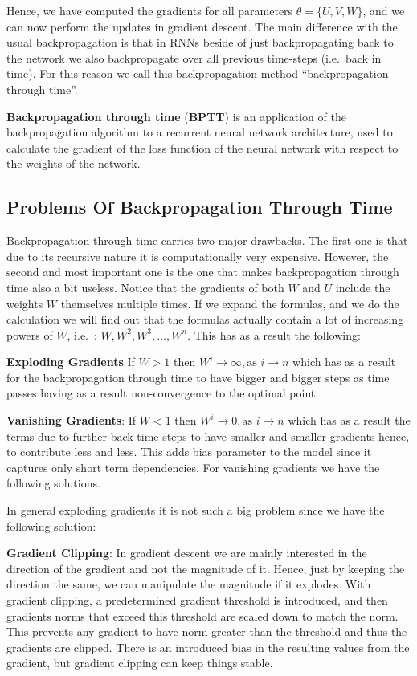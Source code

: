 Hence, we have computed the gradients for all parameters $\theta = \{U, V, W\}$, and we can now perform the updates in
gradient descent. The main difference with the usual backpropagation is that in RNNs beside of just backpropagating
back to the network we also backpropagate over all previous time-steps (i.e.\ back in time). For this reason we call
this backpropagation method ``backpropagation through time''.

\textbf{Backpropagation through time} (\textbf{BPTT}) is an application of the backpropagation algorithm to a recurrent
neural network architecture, used to calculate the gradient of the loss function of the neural network with respect to
the weights of the network.
\ed

\subsection{Problems Of Backpropagation Through Time}

Backpropagation through time carries two major drawbacks. The first one is that due to its recursive nature it is
computationally very expensive. However, the second and most important one is the one that makes backpropagation
through time also a bit useless. Notice that the gradients of both $W$ and $U$ include the weights $W$ themselves
multiple times. If we expand the formulas, and we do the calculation we will find out that the formulas actually
contain a lot of increasing powers of $W$, i.e.\ : $W, W^2, W^3, \ldots, W^n$. This has as a result the following:
\bit
\item \textbf{Exploding Gradients} If $W > 1$ then $W^i \to \infty, \text{as } i \to n$ which has as a result for
the backpropagation through time to have bigger and bigger steps as time passes having as a result non-convergence to
the optimal point.
\item \textbf{Vanishing Gradients}: If $W < 1$ then $W^i \to 0, \text{as } i \to n$ which has as a result the terms
due to further back time-steps to have smaller and smaller gradients hence, to contribute less and less. This adds
bias parameter to the model since it captures only short term dependencies. For vanishing gradients we have the
following solutions.
\eit

In general exploding gradients it is not such a big problem since we have the following solution:
\bit
\item \textbf{Gradient Clipping}: In gradient descent we are mainly interested in the direction of the gradient and
not the magnitude of it. Hence, just by keeping the direction the same, we can manipulate the magnitude if it
explodes. With gradient clipping, a predetermined gradient threshold is introduced, and then gradients norms that
exceed this threshold are scaled down to match the norm. This prevents any gradient to have norm greater than the
threshold and thus the gradients are clipped. There is an introduced bias in the resulting values from the gradient,
but gradient clipping can keep things stable.
\eit

